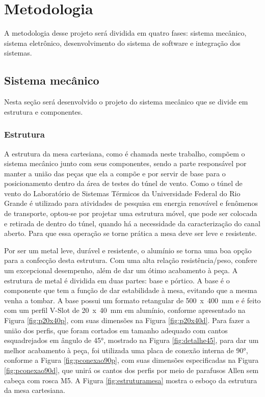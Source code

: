 \chapter{Metodologia}\label{ch:metodologia}

A metodologia desse projeto será dividida em quatro fases: sistema mecânico, sistema eletrônico, 
desenvolvimento do sistema de software e integração dos sistemas.

\section{Sistema mecânico}\label{sec:metmecanico}

Nesta seção será desenvolvido o projeto do sistema mecânico que se divide em estrutura e componentes. 

\subsection{Estrutura}\label{subsec:metestrutura}

A estrutura da mesa cartesiana, como é chamada neste trabalho, compõem o sistema mecânico junto com seus 
componentes, sendo a parte responsável por manter a união das peças que ela a compõe e por servir de base 
para o posicionamento dentro da área de testes do túnel de vento. Como o túnel de vento do Laboratório de 
Sistemas Térmicos da Universidade Federal do Rio Grande é utilizado para atividades de pesquisa em energia 
renovável e fenômenos de transporte, optou-se por projetar uma estrutura móvel, que pode ser colocada e 
retirada de dentro do túnel, quando há a necessidade da caracterização do canal aberto. Para que essa 
operação se torne prática a mesa deve ser leve e resistente.

Por ser um metal leve, durável e resistente, o alumínio se torna uma boa opção para a confecção desta 
estrutura. Com uma alta relação resistência/peso, confere um excepcional desempenho, além de dar um ótimo 
acabamento à peça. A estrutura de metal é dividida em duas partes: base e pórtico. A base é 
o componente que tem a função de dar estabilidade à mesa, evitando que a mesma venha a tombar. A base possui um 
formato retangular de 500~x~400~mm e é feito com um perfil V-Slot de 20~x~40~mm em alumínio, conforme 
apresentado na Figura \ref{fig:p20x40p}, com suas dimensões na Figura \ref{fig:p20x40d}. 
Para fazer a união dos perfis, que foram cortados em tamanho adequado com cantos esquadrejados em 
ângulo de 45°, mostrado na Figura \ref{fig:detalhe45}, para dar um melhor acabamento à peça, foi utilizada uma placa de conexão 
interna de 90°, conforme a Figura \ref{fig:pconexao90p}, com suas dimensões especificadas 
na Figura \ref{fig:pconexao90d}, que unirá os cantos dos perfis por 
meio de parafusos Allen sem cabeça com rosca M5. 
A Figura \ref{fig:estruturamesa} mostra o esboço da estrutura da mesa cartesiana.
    
